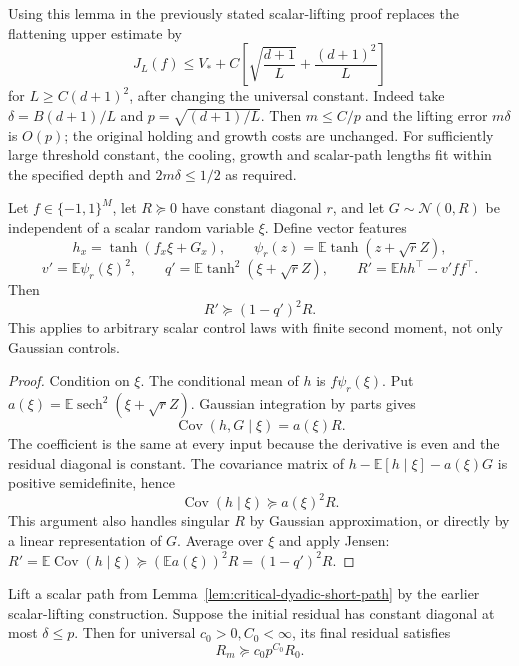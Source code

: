 Using this lemma in the previously stated scalar-lifting proof replaces
the flattening upper estimate by
\[
 J_L(f)\le V_*+
 C\left[\sqrt{\frac{d+1}{L}}+\frac{(d+1)^2}{L}\right]
\]
for $L\ge C(d+1)^2$, after changing the universal constant.
Indeed take $\delta=B(d+1)/L$ and $p=\sqrt{(d+1)/L}$.
Then $m\le C/p$ and the lifting error $m\delta$ is $O(p)$;
the original holding and growth costs are unchanged. For sufficiently
large threshold constant, the cooling, growth and scalar-path lengths
fit within the specified depth and $2m\delta\le1/2$ as required.

\begin{lemma}
\label{lem:critical-residual-spectral}
Let $f\in\{-1,1\}^M$, let $R\succeq0$ have constant diagonal $r$,
and let $G\sim\mathcal N(0,R)$ be independent of a scalar random
variable $\xi$. Define vector features
\[
 h_x=\tanh(f_x\xi+G_x),\qquad
 \psi_r(z)=\mathbb E\tanh(z+\sqrt r Z),
\]
\[
 v'=\mathbb E\psi_r(\xi)^2,\qquad
 q'=\mathbb E\tanh^2(\xi+\sqrt r Z),\qquad
 R'=\mathbb Ehh^\top-v'ff^\top.
\]
Then
\begin{equation}\label{eq:critical-residual-spectral-bound}
 R'\succeq(1-q')^2R.
\end{equation}
This applies to arbitrary scalar control laws with finite second moment,
not only Gaussian controls.
\end{lemma}

\begin{proof}
Condition on $\xi$. The conditional mean of $h$ is $f\psi_r(\xi)$.
Put $a(\xi)=\mathbb E\operatorname{sech}^2(\xi+\sqrt rZ)$.
Gaussian integration by parts gives
\[
 \operatorname{Cov}(h,G\mid\xi)=a(\xi)R.
\]
The coefficient is the same at every input because the derivative is
even and the residual diagonal is constant. The covariance matrix of
$h-\mathbb E[h\mid\xi]-a(\xi)G$ is positive semidefinite, hence
\[
 \operatorname{Cov}(h\mid\xi)\succeq a(\xi)^2R.
\]
This argument also handles singular $R$ by Gaussian approximation, or
directly by a linear representation of $G$.
Average over $\xi$ and apply Jensen:
$R'=\mathbb E\operatorname{Cov}(h\mid\xi)
\succeq(\mathbb Ea(\xi))^2R=(1-q')^2R$.
\end{proof}

\begin{corollary}
\label{cor:critical-polynomial-residual-loss}
Lift a scalar path from Lemma~\ref{lem:critical-dyadic-short-path} by
the earlier scalar-lifting construction. Suppose the initial residual
has constant diagonal at most $\delta\le p$. Then for universal
$c_0>0,C_0<\infty$, its final residual satisfies
\[
 R_m\succeq c_0p^{C_0}R_0.
\]
\end{corollary}

